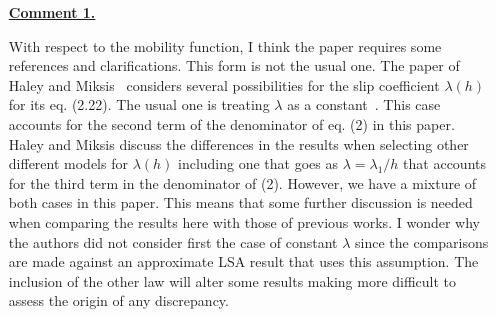 \documentclass[12pt,english]{article}
\begin{document}
\begin{itemize}


\item[ \textbf{\underline{Comment 1.}}]
{
With respect to the mobility function, I think the paper requires some references and clarifications. This form is not the usual one. 
The paper of Haley and Miksis~\cite{Haley_Miksis_1991} considers several possibilities for the slip coefficient $\lambda(h)$ for its eq. (2.22). 
The usual one is treating $\lambda$ as a constant~\cite{gonzalezStabilityLiquidRing2013}. 
This case accounts for the second term of the denominator of eq. (2) in this paper. 
Haley and Miksis discuss the differences in the results when selecting other different models for $\lambda(h)$ including one that goes as $\lambda=\lambda_1/h$ that accounts for the third term in the denominator of (2). 
However, we have a mixture of both cases in this paper. 
This means that some further discussion is needed when comparing the results here with those of previous works. 
I wonder why the authors did not consider first the case of constant $\lambda$ since the comparisons are made against an approximate LSA result that uses this assumption. 
The inclusion of the other law will alter some results making more difficult to assess the origin of any discrepancy.


}
\end{itemize}
\end{document}

